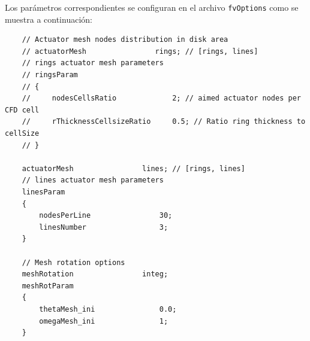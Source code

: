 Los parámetros correspondientes se configuran en el archivo \texttt{fvOptions} como se muestra a continuación:

\begin{scriptsize}
\begin{verbatim}
    // Actuator mesh nodes distribution in disk area
    // actuatorMesh                rings; // [rings, lines]
    // rings actuator mesh parameters
    // ringsParam
    // {
    //     nodesCellsRatio             2; // aimed actuator nodes per CFD cell
    //     rThicknessCellsizeRatio     0.5; // Ratio ring thickness to cellSize
    // }
    
    actuatorMesh                lines; // [rings, lines]
    // lines actuator mesh parameters
    linesParam
    {
        nodesPerLine                30;
        linesNumber                 3;
    }

    // Mesh rotation options
    meshRotation                integ;
    meshRotParam
    {
        thetaMesh_ini               0.0;
        omegaMesh_ini               1;
    }
\end{verbatim}
\end{scriptsize}

